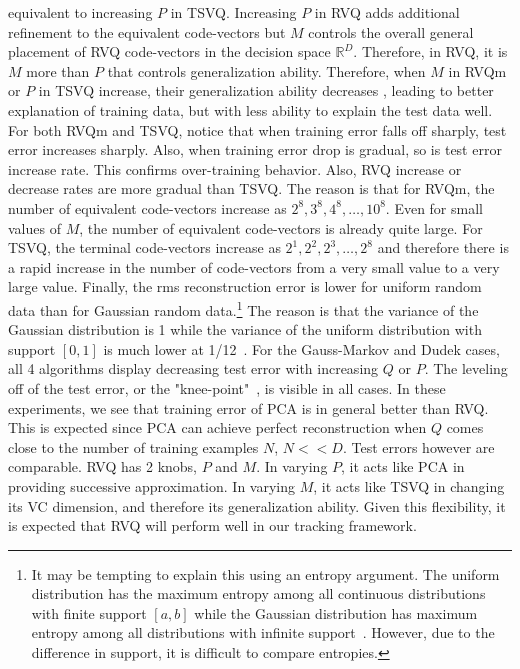 \documentclass{article}
\begin{document}
equivalent to increasing $P$ in TSVQ.  Increasing $P$ in RVQ adds additional refinement to the equivalent code-vectors but $M$ controls the overall general placement of RVQ code-vectors in the decision space $\mathbb{R}^D$.  Therefore, in RVQ, it is $M$ more than $P$ that controls generalization ability.  Therefore, when $M$ in RVQm or $P$ in TSVQ increase, their generalization ability decreases , leading to better explanation of training data, but with less ability to explain the test data well. For both RVQm and TSVQ, notice that when training error falls off sharply, test error increases sharply. Also, when training error drop is gradual, so is test error increase rate. This confirms over-training behavior. Also, RVQ increase or decrease rates are more gradual than TSVQ.  The reason is that for RVQm, the number of equivalent code-vectors increase as $2^8, 3^8, 4^8, \ldots, 10^8$.  Even for small values of $M$, the number of equivalent code-vectors is already quite large.  For TSVQ, the terminal code-vectors increase as $2^1, 2^2, 2^3, \ldots, 2^8$ and therefore there is a rapid increase in the number of code-vectors from a very small value to a very large value.  Finally, the rms reconstruction error is lower for uniform random data than for Gaussian random data.\footnote{It may be tempting to explain this using an entropy argument.  The uniform distribution has the maximum entropy among all continuous distributions with finite support $[a,b]$ while the Gaussian distribution has maximum entropy among all distributions with infinite support~\cite{1982_JNL_MaxEntropy_Jaynes}.  However, due to the difference in support, it is difficult to compare entropies.} The reason is that the variance of the Gaussian distribution is 1 while the variance of the uniform distribution with support $[0,1]$ is much lower at 1/12~\cite{1993_BOOK_RandomProcesses_Garcia}.  For the Gauss-Markov and Dudek cases, all 4 algorithms display decreasing test error with increasing $Q$ or $P$. The leveling off of the test error, or the "knee-point"~\cite{2009_BOOK_PRML_Escolano}, is visible in all cases.  In these experiments, we see that training error of PCA is in general better than RVQ. This is expected since PCA can achieve perfect reconstruction when $Q$ comes close to the number of training examples $N$, $N<<D$.  Test errors however are comparable.  RVQ has 2 knobs, $P$ and $M$. In varying $P$, it acts like PCA in providing successive approximation. In varying $M$, it acts like TSVQ in changing its VC dimension, and therefore its generalization ability.  Given this flexibility, it is expected that RVQ will perform well in our tracking framework.
\end{document}
